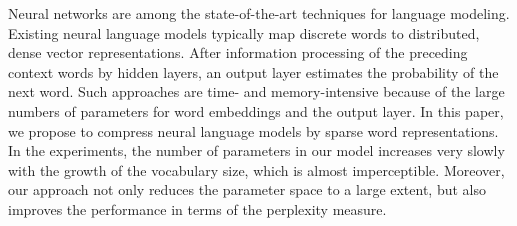 Neural networks are among the state-of-the-art techniques for language modeling. Existing neural language models typically map discrete words to distributed, dense vector representations. After information processing of the preceding context words by hidden layers, an output layer estimates the probability of the next word. Such approaches are time- and memory-intensive because of the large numbers of parameters for word embeddings and the output layer. In this paper, we propose to compress neural language models by sparse word representations. In the experiments, the number of parameters in our model increases very slowly with the growth of the vocabulary size, which is almost imperceptible. Moreover, our approach not only reduces the parameter space to a large extent, but also improves the performance in terms of the perplexity measure.
